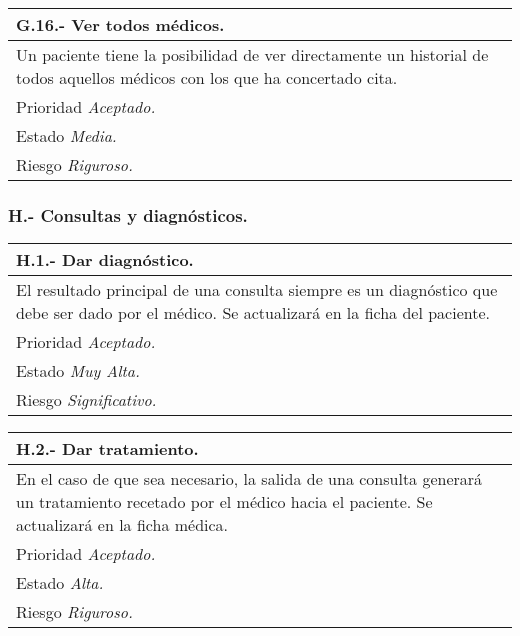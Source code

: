	\begin{center}
	\begin{tabulary}{15cm}{|L|}
		\hline
			\bf{G.16.- Ver todos médicos.} \\
		\hline
			Un paciente tiene la posibilidad de ver directamente un historial de todos aquellos médicos con los que ha concertado cita. \\
		\hline
			Prioridad \textit{Aceptado.} \\
		\hline
			Estado \textit{Media.} \\
		\hline
			Riesgo \textit{Riguroso.} \\
		\hline
	\end{tabulary}
	\end{center}


	\subsubsection{H.- Consultas y diagnósticos.}

	\begin{center}
	\begin{tabulary}{15cm}{|L|}
		\hline
			\bf{H.1.- Dar diagnóstico.} \\
		\hline
			El resultado principal de una consulta siempre es un diagnóstico que debe ser dado por el médico. Se actualizará en la ficha del paciente. \\
		\hline
			Prioridad \textit{Aceptado.} \\
		\hline
			Estado \textit{Muy Alta.} \\
		\hline
			Riesgo \textit{Significativo.} \\
		\hline
	\end{tabulary}
	\end{center}

	\begin{center}
	\begin{tabulary}{15cm}{|L|}
		\hline
			\bf{H.2.- Dar tratamiento.} \\
		\hline
			En el caso de que sea necesario, la salida de una consulta generará un tratamiento recetado por el médico hacia el paciente. Se actualizará en la ficha médica. \\
		\hline
			Prioridad \textit{Aceptado.} \\
		\hline
			Estado \textit{Alta.} \\
		\hline
			Riesgo \textit{Riguroso.} \\
		\hline
	\end{tabulary}
	\end{center}

